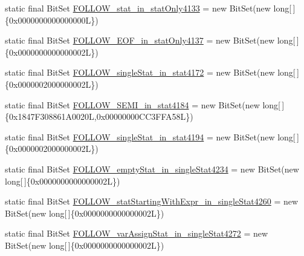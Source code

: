 \begin{DoxyCompactItemize}
\item 
static final Bit\-Set \hyperlink{classorg_1_1tzi_1_1use_1_1parser_1_1shell_1_1_shell_command_parser_ad69d8de522ff87bf8b16b622dbb05e49}{F\-O\-L\-L\-O\-W\-\_\-stat\-\_\-in\-\_\-stat\-Only4133} = new Bit\-Set(new long\mbox{[}$\,$\mbox{]}\{0x0000000000000000\-L\})
\item 
static final Bit\-Set \hyperlink{classorg_1_1tzi_1_1use_1_1parser_1_1shell_1_1_shell_command_parser_a7dbf978ada77a9376387c488e4e16276}{F\-O\-L\-L\-O\-W\-\_\-\-E\-O\-F\-\_\-in\-\_\-stat\-Only4137} = new Bit\-Set(new long\mbox{[}$\,$\mbox{]}\{0x0000000000000002\-L\})
\item 
static final Bit\-Set \hyperlink{classorg_1_1tzi_1_1use_1_1parser_1_1shell_1_1_shell_command_parser_aac36b2101ba8304bf433a15654a39c15}{F\-O\-L\-L\-O\-W\-\_\-single\-Stat\-\_\-in\-\_\-stat4172} = new Bit\-Set(new long\mbox{[}$\,$\mbox{]}\{0x0000002000000002\-L\})
\item 
static final Bit\-Set \hyperlink{classorg_1_1tzi_1_1use_1_1parser_1_1shell_1_1_shell_command_parser_a70bbb8b368140a098c0f5e0ad0ecd595}{F\-O\-L\-L\-O\-W\-\_\-\-S\-E\-M\-I\-\_\-in\-\_\-stat4184} = new Bit\-Set(new long\mbox{[}$\,$\mbox{]}\{0x1847\-F308861\-A0020\-L,0x00000000\-C\-C3\-F\-F\-A58\-L\})
\item 
static final Bit\-Set \hyperlink{classorg_1_1tzi_1_1use_1_1parser_1_1shell_1_1_shell_command_parser_a3564642637f2aa19a4c6e70643ab1348}{F\-O\-L\-L\-O\-W\-\_\-single\-Stat\-\_\-in\-\_\-stat4194} = new Bit\-Set(new long\mbox{[}$\,$\mbox{]}\{0x0000002000000002\-L\})
\item 
static final Bit\-Set \hyperlink{classorg_1_1tzi_1_1use_1_1parser_1_1shell_1_1_shell_command_parser_a8e26035acbf771c32224e700434001f5}{F\-O\-L\-L\-O\-W\-\_\-empty\-Stat\-\_\-in\-\_\-single\-Stat4234} = new Bit\-Set(new long\mbox{[}$\,$\mbox{]}\{0x0000000000000002\-L\})
\item 
static final Bit\-Set \hyperlink{classorg_1_1tzi_1_1use_1_1parser_1_1shell_1_1_shell_command_parser_af1ad33304860ee372b3e551b450c4c0c}{F\-O\-L\-L\-O\-W\-\_\-stat\-Starting\-With\-Expr\-\_\-in\-\_\-single\-Stat4260} = new Bit\-Set(new long\mbox{[}$\,$\mbox{]}\{0x0000000000000002\-L\})
\item 
static final Bit\-Set \hyperlink{classorg_1_1tzi_1_1use_1_1parser_1_1shell_1_1_shell_command_parser_ab4f9515a5e69bd564ce2aed980f8e48b}{F\-O\-L\-L\-O\-W\-\_\-var\-Assign\-Stat\-\_\-in\-\_\-single\-Stat4272} = new Bit\-Set(new long\mbox{[}$\,$\mbox{]}\{0x0000000000000002\-L\})
\item 

\end{DoxyCompactItemize}
